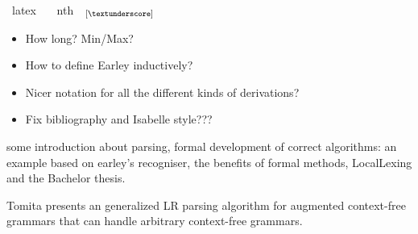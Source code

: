 %
\begin{isabellebody}%
%
%
\isadelimtheory
%
\endisadelimtheory
%
\isatagtheory
%
\endisatagtheory
{\isafoldtheory}%
%
\isadelimtheory
\isanewline
%
\endisadelimtheory
{}\isamarkupfalse%
\ {\isacharparenleft}{\kern0pt}latex\ \isanewline
\ \ nth\ \ {\isacharparenleft}{\kern0pt}{\isachardoublequoteopen}{\isacharunderscore}{\kern0pt}\ensuremath{_{[\mathit{{\isacharunderscore}{\kern0pt}}]}}{\isachardoublequoteclose}\ {\isacharbrackleft}{\kern0pt}{}{}{}{}{\isacharcomma}{\kern0pt}{}{\isacharbrackright}{\kern0pt}\ {}{}{}{}{\isacharparenright}{\kern0pt}%
\isadelimdocument
%
\endisadelimdocument
%
\isatagdocument
%
\isamarkuptrue%
%
\endisatagdocument
{\isafolddocument}%
%
\isadelimdocument
%
\endisadelimdocument
%
\begin{isamarkuptext}%
\begin{itemize}
  \item How long? Min/Max?
  \item How to define Earley inductively?
  \item Nicer notation for all the different kinds of derivations?
  \item Fix bibliography and Isabelle style???
\end{itemize}%
\end{isamarkuptext}\isamarkuptrue%
%
\isadelimdocument
%
\endisadelimdocument
%
\isatagdocument
%
\isamarkuptrue%
%
\isamarkuptrue%
%
\endisatagdocument
{\isafolddocument}%
%
\isadelimdocument
%
\endisadelimdocument
%
\begin{isamarkuptext}%
some introduction about parsing, formal development of correct algorithms: an example based on
earley's recogniser, the benefits of formal methods, LocalLexing and the Bachelor thesis.%
\end{isamarkuptext}\isamarkuptrue%
%
\isadelimdocument
%
\endisadelimdocument
%
\isatagdocument
%
\isamarkuptrue%
%
\endisatagdocument
{\isafolddocument}%
%
\isadelimdocument
%
\endisadelimdocument
%
\begin{isamarkuptext}%
Tomita \cite{Tomita:1987} presents an generalized LR parsing algorithm for augmented
context-free grammars that can handle arbitrary context-free grammars.


\end{isamarkuptext}
\end{isabellebody}
